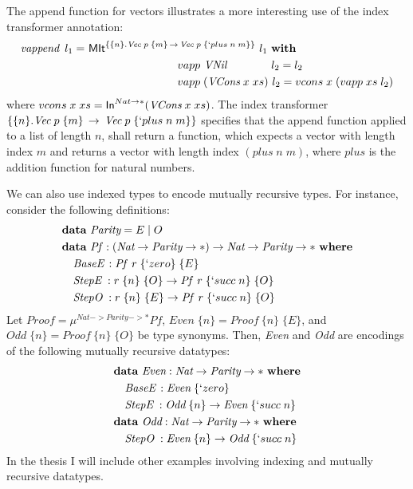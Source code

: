 The append function for vectors illustrates a more interesting use of
the index transformer annotation:
\begin{align*}
\textit{vappend}~\,l_1 =~ &
 \textsf{MIt}^{\{\{n\} . \textit{Vec}\;p\;\{m\} \, -> \, \textit{Vec}\;p\;\{`plus\;n\;m\}\}}~l_1
 ~\textbf{with} \\
&\qquad\qquad\qquad\qquad  vapp ~\textit{VNil}~~~~~~~~~~~ ~ l_2 = l_2 \\
&\qquad\qquad\qquad\qquad  vapp \;(\textit{VCons}\;x\;xs) ~ l_2 = vcons\;x\;(vapp\;xs\;l_2)
\end{align*}
where $vcons\;x\;xs = \textsf{In}^{Nat -> *}(\textit{VCons}\;x\;xs)$.
The index transformer
$\{\{n\} . \textit{Vec}\;p\;\{m\} \, -> \, \textit{Vec}\;p\;\{`plus\;n\;m\}\}$
specifies that the append function applied to a list of length $n$,
shall return a function, which expects a vector with length index $m$
and returns a vector with length index $(plus\;n\;m)$, where $plus$ is the addition
function for natural numbers.

We can also use indexed types to encode mutually recursive types.
For instance, consider the following definitions:
\begin{align*}
&\textbf{data}~ \textit{Parity} = E \mid O \\
&\textbf{data}~ \textit{Pf}\, : (\textit{Nat} -> \textit{Parity} -> *) ->
                                    \textit{Nat} -> \textit{Parity} -> *
  ~\textbf{where}\\
&\quad \textit{BaseE}\, : \textit{Pf}~\,r\;\{`zero\}\;\{E\} \\
&\quad \textit{StepE}\; : r\;\{n\}\;\{O\} -> \textit{Pf}~\,r\;\{`succ\;n\}\;\{O\} \\
&\quad \textit{StepO}\; : r\;\{n\}\;\{E\} -> \textit{Pf}~\,r\;\{`succ\;n\}\;\{O\}
\end{align*}
Let $\textit{Proof} = \mu^{\textit{Nat} -> \textit{Parity} -> *} \textit{Pf}$,
$\textit{Even}\;\{n\} = \textit{Proof}~\{n\}\;\{E\}$, and
$\textit{Odd}\;\{n\} = \textit{Proof}~\{n\}\;\{O\}$ be type synonyms.
Then, \textit{Even} and \textit{Odd} are encodings of the following
mutually recursive datatypes:
\begin{align*}
&\textbf{data}~\textit{Even} : \textit{Nat} -> \textit{Parity} -> *
 ~\textbf{where} \\
&\quad \textit{BaseE}\, : \textit{Even}\;\{`zero\}\\
&\quad \textit{StepE}\; : \textit{Odd}\;\{n\} -> \textit{Even}\;\{`succ\;n\} \\
&\textbf{data}~\textit{Odd} : \textit{Nat} -> \textit{Parity} -> *
 ~\textbf{where} \\
&\quad \textit{StepO}\; : \textit{Even}\;\{n\} -> \textit{Odd}\;\{`succ\;n\}
\end{align*}
In the thesis I will include other examples involving indexing and mutually recursive datatypes.


